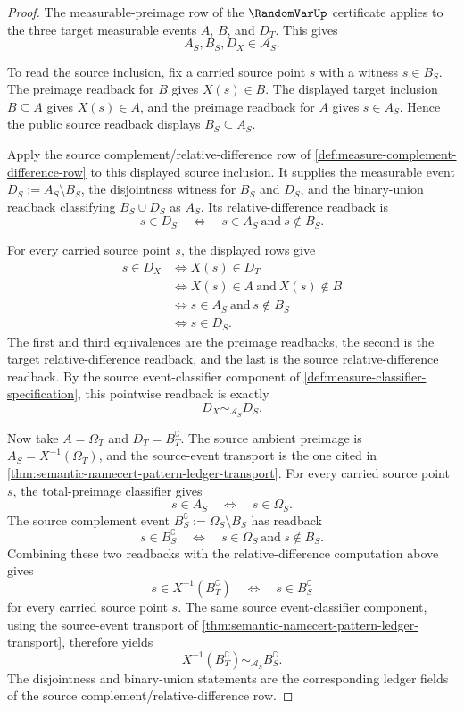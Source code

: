 \begin{proof}
The measurable-preimage row of the $\RandomVarUp$ certificate applies to the three target measurable events $A$, $B$, and $D_T$. This gives
$$
A_S,B_S,D_X\in\mathcal{A}_S.
$$

To read the source inclusion, fix a carried source point $s$ with a witness $s\in B_S$. The preimage readback for $B$ gives $X(s)\in B$. The displayed target inclusion $B\subseteq A$ gives $X(s)\in A$, and the preimage readback for $A$ gives $s\in A_S$. Hence the public source readback displays $B_S\subseteq A_S$.

Apply the source complement/relative-difference row of \autoref{def:measure-complement-difference-row} to this displayed source inclusion. It supplies the measurable event $D_S:=A_S\setminus B_S$, the disjointness witness for $B_S$ and $D_S$, and the binary-union readback classifying $B_S\cup D_S$ as $A_S$. Its relative-difference readback is
$$
s\in D_S\quad\Longleftrightarrow\quad s\in A_S\ \text{and}\ s\notin B_S.
$$

For every carried source point $s$, the displayed rows give
$$
\begin{aligned}
s\in D_X
&\Longleftrightarrow X(s)\in D_T\\
&\Longleftrightarrow X(s)\in A\ \text{and}\ X(s)\notin B\\
&\Longleftrightarrow s\in A_S\ \text{and}\ s\notin B_S\\
&\Longleftrightarrow s\in D_S.
\end{aligned}
$$
The first and third equivalences are the preimage readbacks, the second is the target relative-difference readback, and the last is the source relative-difference readback. By the source event-classifier component of \autoref{def:measure-classifier-specification}, this pointwise readback is exactly
$$
D_X\sim_{\mathcal{A}_S}D_S.
$$

Now take $A=\Omega_T$ and $D_T=B_T^{\complement}$. The source ambient preimage is $A_S=X^{-1}(\Omega_T)$, and the source-event transport is the one cited in \autoref{thm:semantic-namecert-pattern-ledger-transport}. For every carried source point $s$, the total-preimage classifier gives
$$
s\in A_S\quad\Longleftrightarrow\quad s\in\Omega_S.
$$
The source complement event $B_S^{\complement}:=\Omega_S\setminus B_S$ has readback
$$
s\in B_S^{\complement}\quad\Longleftrightarrow\quad s\in\Omega_S\ \text{and}\ s\notin B_S.
$$
Combining these two readbacks with the relative-difference computation above gives
$$
s\in X^{-1}(B_T^{\complement})\quad\Longleftrightarrow\quad s\in B_S^{\complement}
$$
for every carried source point $s$. The same source event-classifier component, using the source-event transport of \autoref{thm:semantic-namecert-pattern-ledger-transport}, therefore yields
$$
X^{-1}(B_T^{\complement})\sim_{\mathcal{A}_S}B_S^{\complement}.
$$
The disjointness and binary-union statements are the corresponding ledger fields of the source complement/relative-difference row.
\end{proof}

